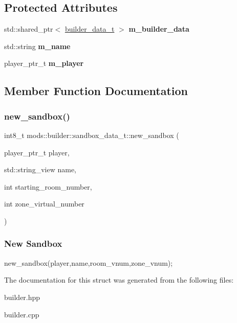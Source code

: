 \subsection*{Protected Attributes}
\begin{DoxyCompactItemize}
\item 
\mbox{\label{structmods_1_1builder_1_1sandbox__data__t_a215732c260fb9a4d9dfc790e9a7be58a}} 
std\+::shared\+\_\+ptr$<$ \hyperlink{structbuilder__data__t}{builder\+\_\+data\+\_\+t} $>$ {\bfseries m\+\_\+builder\+\_\+data}
\item 
\mbox{\label{structmods_1_1builder_1_1sandbox__data__t_acdc6ab27ff88d0d81526e0fc05b6b38a}} 
std\+::string {\bfseries m\+\_\+name}
\item 
\mbox{\label{structmods_1_1builder_1_1sandbox__data__t_a5b645d6951963408fa85fcea64182a57}} 
player\+\_\+ptr\+\_\+t {\bfseries m\+\_\+player}
\end{DoxyCompactItemize}


\subsection{Member Function Documentation}
\mbox{\label{structmods_1_1builder_1_1sandbox__data__t_a81812059faef958893cbd7e0651af226}} 
\subsubsection{\texorpdfstring{new\+\_\+sandbox()}{new\_sandbox()}}
{\footnotesize\ttfamily int8\+\_\+t mods\+::builder\+::sandbox\+\_\+data\+\_\+t\+::new\+\_\+sandbox (\begin{DoxyParamCaption}\item[{player\+\_\+ptr\+\_\+t}]{player,  }\item[{std\+::string\+\_\+view}]{name,  }\item[{int}]{starting\+\_\+room\+\_\+number,  }\item[{int}]{zone\+\_\+virtual\+\_\+number }\end{DoxyParamCaption})}

\subsubsection*{New Sandbox }

new\+\_\+sandbox(player,name,room\+\_\+vnum,zone\+\_\+vnum); 

The documentation for this struct was generated from the following files\+:\begin{DoxyCompactItemize}
\item 
builder.\+hpp\item 
builder.\+cpp\end{DoxyCompactItemize}
